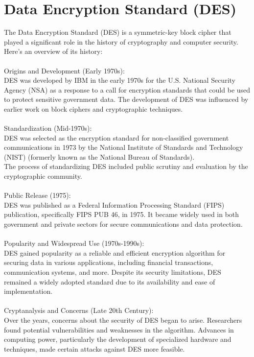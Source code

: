 \documentclass{report}
\begin{document}
\section{Data Encryption Standard (DES)}
The Data Encryption Standard (DES) is a symmetric-key block cipher that played a significant role in the history of cryptography and computer security. Here's an overview of its history:\\
\\
Origins and Development (Early 1970s):\\
DES was developed by IBM in the early 1970s for the U.S. National Security Agency (NSA) as a response to a call for encryption standards that could be used to protect sensitive government data.
The development of DES was influenced by earlier work on block ciphers and cryptographic techniques.\\
\\
Standardization (Mid-1970s):\\
DES was selected as the encryption standard for non-classified government communications in 1973 by the National Institute of Standards and Technology (NIST) (formerly known as the National Bureau of Standards).\\
The process of standardizing DES included public scrutiny and evaluation by the cryptographic community.\\
\\
Public Release (1975):\\
DES was published as a Federal Information Processing Standard (FIPS) publication, specifically FIPS PUB 46, in 1975.
It became widely used in both government and private sectors for secure communications and data protection.\\
\\
Popularity and Widespread Use (1970s-1990s):\\
DES gained popularity as a reliable and efficient encryption algorithm for securing data in various applications, including financial transactions, communication systems, and more.
Despite its security limitations, DES remained a widely adopted standard due to its availability and ease of implementation.\\
\\
Cryptanalysis and Concerns (Late 20th Century):\\
Over the years, concerns about the security of DES began to arise. Researchers found potential vulnerabilities and weaknesses in the algorithm.
Advances in computing power, particularly the development of specialized hardware and techniques, made certain attacks against DES more feasible.\\
\end{document}
